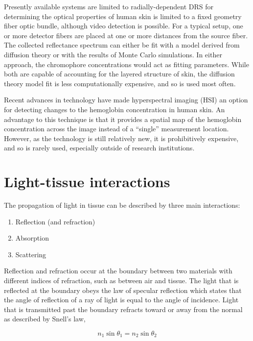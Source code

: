Presently available systems are limited to radially-dependent DRS for determining the optical properties of human skin is limited to a fixed geometry fiber optic bundle, although video detection is possible. For a typical setup, one or more detector fibers are placed at one or more distances from the source fiber. The collected reflectance spectrum can either be fit with a model derived from diffusion theory or with the results of Monte Carlo simulations.\cite{Nishidate2011a} In either approach, the chromophore concentrations would act as fitting parameters. While both are capable of accounting for the layered structure of skin, the diffusion theory model fit is less computationally expensive, and so is used most often.\cite{Zonios2001,Zonios2009,Reif2011,Tseng2012}

Recent advances in technology have made hyperspectral imaging (HSI) an option for detecting changes to the hemoglobin concentration in human skin.\cite{Yudovsky2010,Chin2012} An advantage to this technique is that it provides a spatial map of the hemoglobin concentration across the image instead of a ``single'' measurement location. However, as the technology is still relatively new, it is prohibitively expensive, and so is rarely used, especially outside of research institutions.

\section{Light-tissue interactions}
The propagation of light in tissue can be described by three main interactions:\cite{Niemz2007}
\begin{enumerate}
	\item Reflection (and refraction)
	\item Absorption
	\item Scattering
\end{enumerate}

Reflection and refraction occur at the boundary between two materials with different indices of refraction, such as between air and tissue. The light that is reflected at the boundary obeys the law of specular reflection which states that the angle of reflection of a ray of light is equal to the angle of incidence.\cite{Knight2013} Light that is transmitted past the boundary refracts toward or away from the normal as described by Snell's law,

\begin{equation}
n_1 \sin \theta_1 = n_2 \sin \theta_2
\end{equation}

